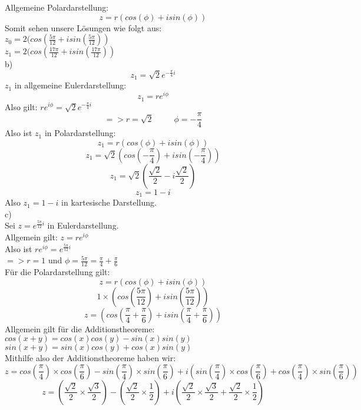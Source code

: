 \documentclass[11pt]{article}
\begin{document}
				Allgemeine Polardarstellung:\\
				$$z=r(cos(\phi)+isin(\phi))$$
				Somit sehen unsere Lösungen wie folgt aus:\\
				\indent $z_0=2(cos(\frac{5\pi}{12}+isin(\frac{5\pi}{12}))$\\
				\indent $z_1=2(cos(\frac{17\pi}{12}+isin(\frac{17\pi}{12}))$\\
			\indent b)\\
				$$z_1=\sqrt{2}e^{-\frac{\pi}{4}i}$$
				$z_1$ in allgemeine Eulerdarstellung:
				$$z_1=re^{i\phi}$$
				Also gilt: $re^{i\phi} = \sqrt{2}e^{-\frac{\pi}{4}i}$\\
				$$=> r=\sqrt{2} \hspace{30pt} \phi=-\frac{\pi}{4}$$
				Also ist $z_1$ in Polardarstellung:
				$$z_1=r(cos(\phi)+isin(\phi))$$
				$$z_1=\sqrt{2}(cos\left(-\frac{\pi}{4}\right)+isin\left(-\frac{\pi}{4}\right))$$
				$$z_1=\sqrt{2}\left(\frac{\sqrt{2}}{2}-i\frac{\sqrt{2}}{2}\right)$$
				$$z_1=1-i$$
				Also $z_1=1-i$ in kartesische Darstellung.\\
			\indent c)\\
				Sei $z=e^{\frac{5\pi}{12}i}$ in Eulerdarstellung.\\
				Allgemein gilt: $z=re^{i\phi}$\\
				Also ist $re^{i\phi}=e^{\frac{5\pi}{12}i}$\\
				$=> r=1$ und $\phi = \frac{5\pi}{12}=\frac{\pi}{4}+\frac{\pi}{6}$\\
				Für die Polardarstellung gilt:\\
				$$z=r(cos(\phi)+isin(\phi))$$
				$$1\times(cos\left(\frac{5\pi}{12}\right)+isin\left(\frac{5\pi}{12}\right))$$
				$$z=\left(cos\left(\frac{\pi}{4}+\frac{\pi}{6}\right)+isin\left(\frac{\pi}{4}+\frac{\pi}{6}\right)\right)$$
				Allgemein gilt für die Additionstheoreme:\\
				\indent $cos(x+y)=cos(x)cos(y)-sin(x)sin(y)$\\
				\indent $sin(x+y)=sin(x)cos(y)+cos(x)sin(y)$\\
				Mithilfe also der Additionstheoreme haben wir:
				$$z=cos\left(\frac{\pi}{4}\right)\times cos\left(\frac{\pi}{6}\right)-sin\left(\frac{\pi}{4}\right)\times sin\left(\frac{\pi}{6}\right)+i\left(sin\left(\frac{\pi}{4}\right)\times cos\left(\frac{\pi}{6}\right)+cos\left(\frac{\pi}{4}\right)\times sin\left(\frac{\pi}{6}\right)\right)$$
				$$z=\left(\frac{\sqrt{2}}{2}\times \frac{\sqrt{3}}{2}\right)-\left(\frac{\sqrt{2}}{2}\times \frac{1}{2}\right)+i\left(\frac{\sqrt{2}}{2}\times \frac{\sqrt{3}}{2}+\frac{\sqrt{2}}{2}\times \frac{1}{2}\right)$$
\end{document}
